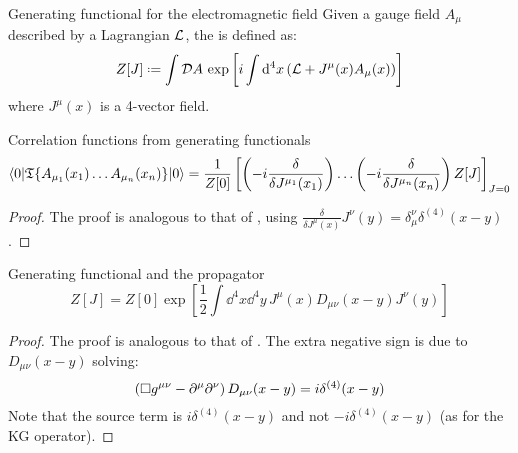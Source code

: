 \begin{definition}{Generating functional for the electromagnetic field}{}
  Given a gauge field $ A_\mu $ described by a Lagrangian $ \mathcal{L} $, the  is defined as:
  \begin{equation}
    Z[J] \defeq \int \mathcal{D}A\, \exp \left[ i \int \dd^4x \left( \lag + J^\mu(x) A_\mu(x) \right) \right]
  \end{equation}
  where $ J^\mu(x) $ is a 4-vector field.
\end{definition}

\begin{lemma}[before upper = {\tcbtitle}]{Correlation functions from generating functionals}{}
  \begin{equation}
    \braket{0 | \mathfrak{T}\{A_{\mu_1}(x_1) \dots A_{\mu_n}(x_n)\} | 0} = \frac{1}{Z[0]} \left[ \left( -i \frac{\delta}{\delta J^{\mu_1}(x_1)} \right) \dots \left( -i \frac{\delta}{\delta J^{\mu_n}(x_n)} \right) Z[J] \right]_{J = 0}
  \end{equation}
\end{lemma}

\begin{proofbox}
  \begin{proof}
    The proof is analogous to that of , using $ \frac{\delta}{\delta J^\mu(x)} J^\nu(y) = \delta^\nu_\mu \delta^{(4)}(x-y) $.
  \end{proof}
\end{proofbox}

\begin{proposition}[before upper = {\tcbtitle}]{Generating functional and the propagator}{}
  \begin{equation}
    Z[J] = Z[0] \exp \left[ \frac{1}{2} \int \dd^4x \dd^4y\, J^\mu(x) D_{\mu \nu}(x-y) J^\nu(y) \right]
  \end{equation}
\end{proposition}

\begin{proofbox}
  \begin{proof}
    The proof is analogous to that of . The extra negative sign is due to $ D_{\mu \nu}(x-y) $ solving:
    \begin{equation}
      \left( \Box g^{\mu \nu} - \partial^\mu \partial^\nu \right) D_{\mu \nu}(x-y) = i \delta^{(4)}(x-y)
    \end{equation}
    Note that the source term is $ i \delta^{(4)}(x-y) $ and not $ -i \delta^{(4)}(x-y) $ (as for the KG operator).
  \end{proof}
\end{proofbox}


